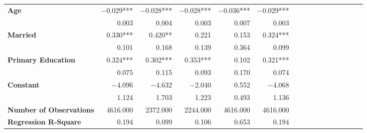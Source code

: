 \begin{tabular}{@{\extracolsep{5pt}}lrrrrrrrrrrrrrrr}
{\bf Age} & $-$0.029\phantom{)}*** & $-$0.028\phantom{)}*** & $-$0.028\phantom{)}*** & $-$0.036\phantom{)}*** & $-$0.029\phantom{)}*** \\
{\bf } & 0.003\phantom{\phantom{)}***} & 0.004\phantom{\phantom{)}***} & 0.003\phantom{\phantom{)}***} & 0.007\phantom{\phantom{)}***} & 0.003\phantom{\phantom{)}***} \\
{\bf Married} & 0.330\phantom{)}*** & 0.420\phantom{)}**\phantom{*} & 0.221\phantom{\phantom{)}***} & 0.153\phantom{\phantom{)}***} & 0.324\phantom{)}*** \\
{\bf } & 0.101\phantom{\phantom{)}***} & 0.168\phantom{\phantom{)}***} & 0.139\phantom{\phantom{)}***} & 0.364\phantom{\phantom{)}***} & 0.099\phantom{\phantom{)}***} \\
{\bf Primary Education} & 0.324\phantom{)}*** & 0.302\phantom{)}*** & 0.353\phantom{)}*** & 0.102\phantom{\phantom{)}***} & 0.321\phantom{)}*** \\
{\bf } & 0.075\phantom{\phantom{)}***} & 0.115\phantom{\phantom{)}***} & 0.093\phantom{\phantom{)}***} & 0.170\phantom{\phantom{)}***} & 0.074\phantom{\phantom{)}***} \\
{\bf Constant} & $-$4.096\phantom{\phantom{)}***} & $-$4.632\phantom{\phantom{)}***} & $-$2.040\phantom{\phantom{)}***} & 0.552\phantom{\phantom{)}***} & $-$4.068\phantom{\phantom{)}***} \\
{\bf } & 1.124\phantom{\phantom{)}***} & 1.703\phantom{\phantom{)}***} & 1.223\phantom{\phantom{)}***} & 0.493\phantom{\phantom{)}***} & 1.136\phantom{\phantom{)}***} \\
{\bf Number of Observations} & 4616.000\phantom{\phantom{)}***} & 2372.000\phantom{\phantom{)}***} & 2244.000\phantom{\phantom{)}***} & 4616.000\phantom{\phantom{)}***} & 4616.000\phantom{\phantom{)}***} \\
{\bf Regression R-Square} & 0.194\phantom{***} & 0.099\phantom{***} & 0.106\phantom{***} & 0.653\phantom{***} & 0.194\phantom{***} \\
\hline
\end{tabular}
